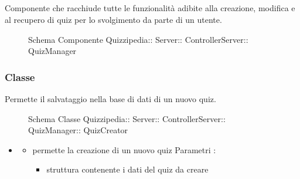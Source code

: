 \subsection{}
Componente che racchiude tutte le funzionalità adibite alla creazione, modifica e al recupero di quiz per lo svolgimento da parte di un utente.
\begin{figure}[H]
\centering
\noindent{}
\caption[Schema Componente QuizManager]{Schema Componente Quizzipedia:: Server:: ControllerServer:: QuizManager}
\end{figure}
\subsubsection{Classe }
Permette il salvataggio nella base di dati di un nuovo quiz.
\begin{figure}[H]
\centering
\noindent{}
\caption[Schema Classe QuizCreator]{Schema Classe Quizzipedia:: Server:: ControllerServer:: QuizManager:: QuizCreator}
\end{figure}
\begin{itemize}
\item {}
\begin{itemize}
\item {}
\newline
permette la creazione di un nuovo quiz
\newline
Parametri :
\begin{itemize}
\item {}
\newline
struttura contenente i dati del quiz da creare
\end{itemize}
\end{itemize}
\end{itemize}
